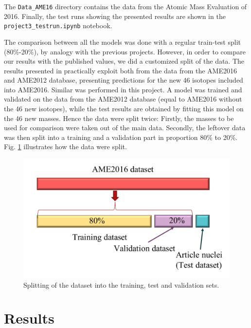 \documentclass[numberedappendix, twocolappendix]{emulateapj}
\begin{document}
 The \texttt{Data\_AME16} directory contains the data from the Atomic Mass Evaluation of 2016. Finally, the test runs showing the presented results are shown in the \texttt{project3\_testrun.ipynb} notebook.


The comparison between all the models was done with a regular train-test split (80\%-20\%), by analogy with the previous projects. However, in order to compare our results with the published values, we did a customized split of the data. The results presented in \cite{utama2017, trees in nuclear} practically exploit both from the data from the AME2016 and AME2012 database, presenting predictions for the new 46 isotopes included into AME2016. Similar was performed in this project. A model was trained and validated on the data from the AME2012 database (equal to AME2016 without the 46 new isotopes), while the test results are obtained by fitting this model on the 46 new masses. Hence the data were split twice: Firstly, the masses to be used for comparison were taken out of the main data. Secondly, the leftover data was then split into a training and a validation part in proportion 80\% to 20\%. Fig. \ref{fig: validation} illustrates how the data were split.

\begin{figure}[!htb]
    \centering
    \includegraphics[width=.49\textwidth]{Figures/Validation.pdf}
    \caption{Splitting of the dataset into the training, test and validation sets.}
    \label{fig: validation}
\end{figure}



\section{Results}
\label{sec: Results}
\end{document}
